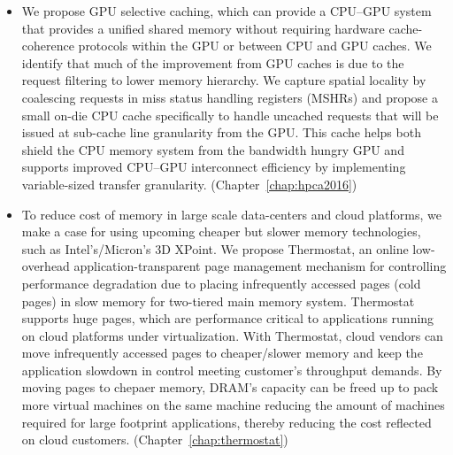 \begin{itemize}
\item
We propose GPU selective caching, which can provide a CPU--GPU system that
provides a unified shared memory without requiring hardware cache-coherence
protocols within the GPU or between CPU and GPU caches.  We identify that much
of the improvement from GPU caches is due to the request filtering to lower
memory hierarchy. We capture spatial locality by coalescing requests in miss
status handling registers (MSHRs) and propose a small on-die CPU cache
specifically to handle uncached requests that will be issued at sub-cache line
granularity from the GPU. This cache helps both shield the CPU memory system
from the bandwidth hungry GPU and supports improved CPU--GPU interconnect
efficiency by implementing variable-sized transfer granularity.
(Chapter~\ref{chap:hpca2016})


%
\item
To reduce cost of memory in large scale data-centers and cloud platforms, we
make a case for using upcoming cheaper but slower memory technologies, such as
Intel's/Micron's 3D XPoint. We propose Thermostat, an online low-overhead
application-transparent page management mechanism for controlling performance
degradation due to placing infrequently accessed pages (cold pages) in slow
memory for two-tiered main memory system. Thermostat supports huge pages, which
are performance critical to applications running on cloud platforms under
virtualization. With Thermostat, cloud vendors can move infrequently accessed
pages to cheaper/slower memory and keep the application slowdown in control
meeting customer's throughput demands. By moving pages to chepaer memory, DRAM's
capacity can be freed up to pack more virtual machines on the same machine
reducing the amount of machines required for large footprint applications,
thereby reducing the cost reflected on cloud customers.
(Chapter~\ref{chap:thermostat})


\end{itemize}
